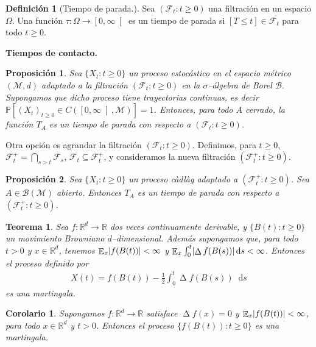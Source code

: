 \documentclass{report}
\newcommand{\cadlag}{càdlàg}
\newcommand{\prob}{\mathbb{P}}
\newcommand{\events}{\mathcal{F}}
\newcommand{\eventspp}{\events^+}
\newcommand{\borel}{\mathscr{B}}
\newcommand{\metricSpace}{\mathcal{M}}
\newcommand{\brownian}{B}
\newcommand{\dd}{\mathop{}\!\mathrm{d}}
\newcommand{\realNumbers}{\mathbb{R}}
\DeclareMathOperator{\laplacian}{\Delta}
\DeclareMathOperator{\Expectation}{\mathbb{E}}
\DeclarePairedDelimiter{\abs}{\lvert}{\rvert}
\theoremstyle{plain}
\newtheorem{theorem}{Teorema}
\newtheorem{proposition}{Proposición}
\newtheorem{corollary}{Corolario}
\theoremstyle{remark}
\theoremstyle{definition}
\newtheorem{definition}{Definición}
\begin{document}
\begin{definition}[Tiempo de parada.]
Sea \((\events_t : t \geq 0)\) una filtración en un espacio \(\Omega\).
Una función \(\tau : \Omega \rightarrow \left[ 0, \infty \right[\) es un tiempo de parada si \([T \leq t] \in \events_t\) para todo \(t \geq 0\).
\end{definition}

\textbf{Tiempos de contacto.}

\begin{proposition}
  Sea \(\{X_t : t \geq 0\}\) un proceso estocástico en el espacio métrico \((\metricSpace{}, d)\) adaptado a la filtración \((\events_t : t \geq 0)\) en la \(\sigma\)--álgebra de Borel \(\borel\).
  Supongamos que dicho proceso tiene trayectorias continuas, es decir \(\prob[ (X_t)_{t \geq 0} \in C(\left[0, \infty \right[, \metricSpace{})] = 1\).
  Entonces, para todo \(A\) cerrado, la función \(T_A\) es un tiempo de parada con respecto a \((\events_t : t \geq 0)\).
\end{proposition}

Otra opción es agrandar la filtración \((\events_t : t \geq 0)\).
Definimos, para \(t \geq 0\), \(\eventspp_t = \bigcap_{s > t} \events_s\), \(\events_t \subseteq \eventspp_t\), y consideramos la nueva filtración \((\eventspp_t : t \geq 0)\).
\begin{proposition}
  Sea \(\{X_t : t \geq 0\}\) un proceso \cadlag{} adaptado a \((\eventspp_t : t \geq 0)\).
  Sea \(A \in \borel(\metricSpace{})\) abierto.
  Entonces \(T_A\) es un tiempo de parada con respecto a \((\eventspp_t : t \geq 0)\).
\end{proposition}


\begin{theorem}
  Sea \(f : \realNumbers^d \rightarrow \realNumbers\) dos veces continuamente derivable, y \(\{\brownian(t) : t \geq 0\}\) un movimiento Browniano \(d\)--dimensional.
  Además supongamos que, para todo \(t > 0\) y \(x \in \realNumbers^d\), tenemos \(\Expectation_x \abs{f(\brownian(t))} < \infty\) y \(\Expectation_x \int_0^t \abs{\laplacian f(\brownian(s))} \dd s < \infty\).
  Entonces el proceso definido por
  \begin{align}
    X(t)
    =
    f(\brownian(t)) - \frac{1}{2} \int_0^t \laplacian f(\brownian(s)) \dd s
  \end{align}
  es una martingala.
\end{theorem}
\begin{corollary}
  Supongamos \(f : \realNumbers^d \rightarrow \realNumbers\) satisface \(\laplacian f(x) = 0\) y \(\Expectation_x \abs{f(\brownian(t))} < \infty\), para todo \(x \in \realNumbers^d\) y \(t > 0\).
  Entonces el proceso \(\{f(\brownian(t)) : t \geq 0\}\) es una martingala.
\end{corollary}
\end{document}
